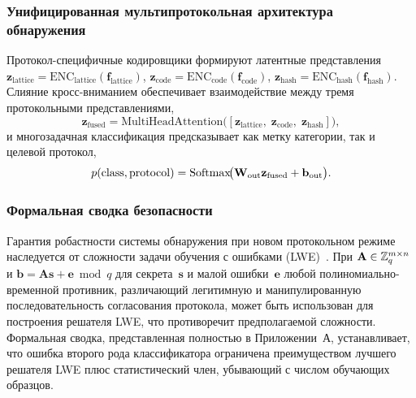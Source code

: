 \subsubsection{Унифицированная мультипротокольная архитектура обнаружения}

Протокол-специфичные кодировщики формируют латентные представления $\mathbf{z}_{\mathrm{lattice}}=\mathrm{ENC}_{\mathrm{lattice}}(\mathbf{f}_{\mathrm{lattice}})$, $\mathbf{z}_{\mathrm{code}}=\mathrm{ENC}_{\mathrm{code}}(\mathbf{f}_{\mathrm{code}})$, $\mathbf{z}_{\mathrm{hash}}=\mathrm{ENC}_{\mathrm{hash}}(\mathbf{f}_{\mathrm{hash}})$. Слияние кросс-вниманием обеспечивает взаимодействие между тремя протокольными представлениями,
\begin{equation}
\mathbf{z}_{\mathrm{fused}}
= \mathrm{MultiHeadAttention}\!\bigl(
  [\mathbf{z}_{\mathrm{lattice}},\;
   \mathbf{z}_{\mathrm{code}},\;
   \mathbf{z}_{\mathrm{hash}}]\bigr),
\label{eq:pq_fusion}
\end{equation}
и многозадачная классификация предсказывает как метку категории, так и целевой протокол,
\begin{equation}
p(\mathrm{class},\mathrm{protocol})
= \mathrm{Softmax}\!\bigl(\mathbf{W}_{\mathrm{out}}\mathbf{z}_{\mathrm{fused}}
  + \mathbf{b}_{\mathrm{out}}\bigr).
\label{eq:pq_class}
\end{equation}

\subsubsection{Формальная сводка безопасности}

Гарантия робастности системы обнаружения при новом протокольном режиме наследуется от сложности задачи обучения с ошибками (LWE)~\cite{Regev2009,Peikert2016}. При $\mathbf{A}\in\mathbb{Z}_q^{m\times n}$ и $\mathbf{b}=\mathbf{A}\mathbf{s}+\mathbf{e}\bmod q$ для секрета~$\mathbf{s}$ и малой ошибки~$\mathbf{e}$ любой полиномиально-временной противник, различающий легитимную и манипулированную последовательность согласования протокола, может быть использован для построения решателя LWE, что противоречит предполагаемой сложности. Формальная сводка, представленная полностью в Приложении~А, устанавливает, что ошибка второго рода классификатора ограничена преимуществом лучшего решателя LWE плюс статистический член, убывающий с числом обучающих образцов.

